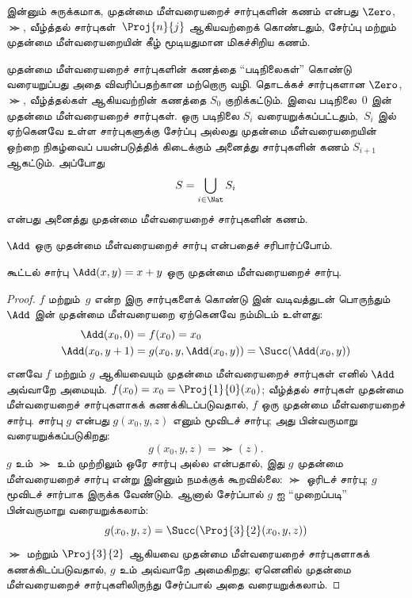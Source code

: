 \documentclass[../../../include/open-logic-section]{subfiles}
\begin{document}
\begin{explain}
இன்னும் சுருக்கமாக, முதன்மை மீள்வரையறைச் சார்புகளின் கணம் என்பது
$\Zero$, $\Succ$, வீழ்த்தல் சார்புகள்~$\Proj{n}{j}$ ஆகியவற்றைக்
கொண்டதும், சேர்ப்பு மற்றும் முதன்மை மீள்வரையறையின் கீழ் மூடியதுமான
மிகச்சிறிய கணம்.

முதன்மை மீள்வரையறைச் சார்புகளின் கணத்தை “படிநிலைகள்” கொண்டு
வரையறுப்பது அதை விவரிப்பதற்கான மற்றொரு வழி. தொடக்கச் சார்புகளான
$\Zero$, $\Succ$, வீழ்த்தல்கள் ஆகியவற்றின் கணத்தை $S_0$ குறிக்கட்டும்.
இவை படிநிலை~$0$ இன் முதன்மை மீள்வரையறைச் சார்புகள். ஒரு படிநிலை
$S_i$ வரையறுக்கப்பட்டதும்,~$S_i$ இல் ஏற்கெனவே உள்ள சார்புகளுக்கு
சேர்ப்பு அல்லது முதன்மை மீள்வரையறையின் ஒற்றை நிகழ்வைப் பயன்படுத்திக்
கிடைக்கும் அனைத்து சார்புகளின் கணம் $S_{i+1}$ ஆகட்டும். அப்போது
\[
S = \bigcup_{i \in \Nat} S_i
\]
என்பது அனைத்து முதன்மை மீள்வரையறைச் சார்புகளின் கணம்.
\end{explain}

$\Add$ ஒரு முதன்மை மீள்வரையறைச் சார்பு என்பதைச் சரிபார்ப்போம்.

\begin{prop}
  கூட்டல் சார்பு $\Add(x,y) = x+y$ ஒரு முதன்மை மீள்வரையறைச் சார்பு.
\end{prop}

\begin{proof}
$f$ மற்றும்~$g$ என்ற இரு சார்புகளைக் கொண்டு
 இன் வடிவத்துடன் பொருந்தும்
$\Add$ இன் முதன்மை மீள்வரையறை ஏற்கெனவே நம்மிடம் உள்ளது:
\begin{align*}
  \Add(x_0, 0) & = f(x_0) = x_0\\
  \Add(x_0, y+1) & = g(x_0, y, \Add(x_0, y)) =
  \Succ(\Add(x_0, y))
\end{align*}
எனவே $f$ மற்றும் $g$ ஆகியவையும் முதன்மை மீள்வரையறைச் சார்புகள்
எனில் $\Add$ அவ்வாறே அமையும். $f(x_0) = x_0 =
\Proj{1}{0}(x_0)$; வீழ்த்தல் சார்புகள் முதன்மை மீள்வரையறைச்
சார்புகளாகக் கணக்கிடப்படுவதால், $f$ ஒரு முதன்மை மீள்வரையறைச்
சார்பு. சார்பு $g$ என்பது $g(x_0, y, z)$ எனும் மூவிடச் சார்பு;
அது பின்வருமாறு வரையறுக்கப்படுகிறது:
\[
g(x_0, y, z) = \Succ(z).
\]
$g$ உம் $\Succ$ உம் முற்றிலும் ஒரே சார்பு அல்ல என்பதால், இது
$g$ முதன்மை மீள்வரையறைச் சார்பு என்று இன்னும் நமக்குக் கூறவில்லை:
$\Succ$ ஓரிடச் சார்பு; $g$ மூவிடச் சார்பாக இருக்க வேண்டும்.
ஆனால் சேர்ப்பால் $g$ ஐ “முறைப்படி” பின்வருமாறு வரையறுக்கலாம்:
\[
g(x_0, y, z) = \Succ(\Proj{3}{2}(x_0, y, z))
\]
$\Succ$ மற்றும் $\Proj{3}{2}$ ஆகியவை முதன்மை மீள்வரையறைச்
சார்புகளாகக் கணக்கிடப்படுவதால், $g$ உம் அவ்வாறே அமைகிறது;
ஏனெனில் முதன்மை மீள்வரையறைச் சார்புகளிலிருந்து சேர்ப்பால் அதை
வரையறுக்கலாம்.
\end{proof}
\end{document}
